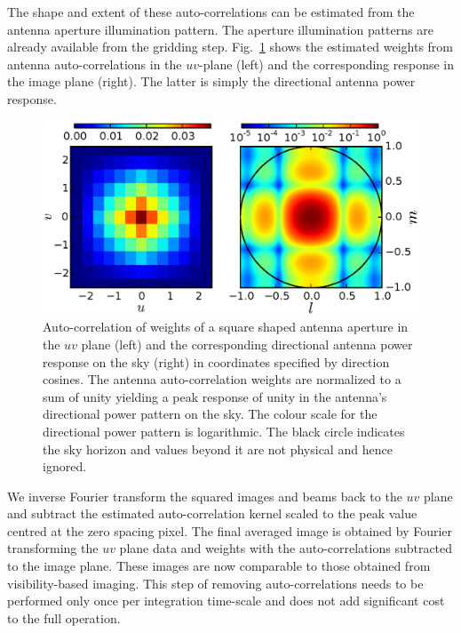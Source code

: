 \documentclass[a4paper,fleqn,usenatbib]{mnras}
\begin{document}
The shape and extent of these auto-correlations can be estimated from the antenna aperture illumination pattern. The aperture illumination patterns are already available from the gridding step. Fig.~\ref{fig:autocorr_wts_PB} shows the estimated weights from antenna auto-correlations in the $uv$-plane (left) and the corresponding response in the image plane (right). The latter is simply the directional antenna power response. 

\begin{figure}
  \includegraphics[width=\columnwidth]{figure4}
  \caption{Auto-correlation of weights of a square shaped antenna aperture in the $uv$ plane (left) and the corresponding directional antenna power response on the sky (right) in coordinates specified by direction cosines. The antenna auto-correlation weights are normalized to a sum of unity yielding a peak response of unity in the antenna's directional power pattern on the sky. The colour scale for the directional power pattern is logarithmic. The black circle indicates the sky horizon and values beyond it are not physical and hence ignored.}
  \label{fig:autocorr_wts_PB}
\end{figure}

We inverse Fourier transform the squared images and beams back to the $uv$ plane and subtract the estimated auto-correlation kernel scaled to the peak value centred at the zero spacing pixel. The final averaged image is obtained by Fourier transforming the $uv$ plane data and weights with the auto-correlations subtracted to the image plane. These images are now comparable to those obtained from visibility-based imaging. This step of removing auto-correlations needs to be performed only once per integration time-scale and does not add significant cost to the full operation.
\end{document}
